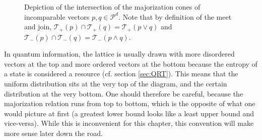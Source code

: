 \begin{figure}[h!]
    \centering
    \caption{Depiction of the intersection of the majorization cones of incomparable vectors $p, q \in \mathcal{P}^d$. Note that by definition of the meet and join, $\mathcal{T}_+ (p) \cap \mathcal{T}_+ (q) = \mathcal{T}_+ (p \vee q)$ and $\mathcal{T}_- (p) \cap \mathcal{T}_- (q) = \mathcal{T}_- (p \wedge q)$.}
    \label{fig:meet_join_example}
\end{figure}

In quantum information, the lattice is usually drawn with more disordered vectors at the top and more ordered vectors at the bottom because the entropy of a state is considered a resource (cf. section \ref{sec:QRT}). This means that the uniform distribution sits at the very top of the diagram, and the certain distribution at the very bottom. One should therefore be careful, because the majorization relation runs from top to bottom, which is the opposite of what one would picture at first (a greatest lower bound looks like a least upper bound and vice-versa). While this is inconvenient for this chapter, this convention will make more sense later down the road.



